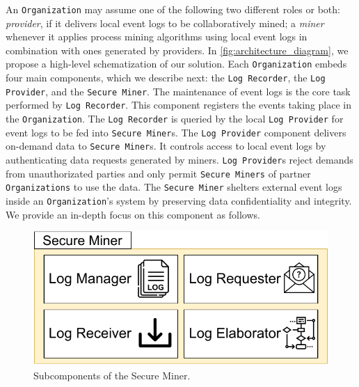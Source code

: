 An \texttt{Organization} may assume one of the following two different roles or both: \textit{provider}, if it delivers local event logs to be collaboratively mined; a \textit{miner} whenever it applies process mining algorithms using local event logs in combination with ones generated by providers. In \cref{fig:architecture_diagram}, we propose a high-level schematization of our solution. Each \texttt{Organization} embeds four main components, which we describe next: the \texttt{Log Recorder}, the \texttt{Log Provider}, and the \texttt{Secure Miner}. The maintenance of event logs is the core task performed by \texttt{Log Recorder}. This component registers the events taking place in the \texttt{Organization}. The \texttt{Log Recorder} is queried by the local \texttt{Log Provider} for event logs to be fed into \texttt{Secure Miner}s. The \texttt{Log Provider} component delivers on-demand data to \texttt{Secure Miner}s. It controls access to local event logs by authenticating data requests generated by miners. \texttt{Log Provider}s reject demands from unauthorizated parties and only permit \texttt{Secure Miners} of partner \texttt{Organizations} to use the data. The \texttt{Secure Miner} shelters external event logs inside an \texttt{Organization}'s system by preserving data confidentiality and integrity. We provide an in-depth focus on this component as follows.

\begin{figure}[t]
	\centering
	\includegraphics[width=0.6\linewidth]{content/figures/secure_miner.pdf}
	\caption{Subcomponents of the Secure Miner.}
	\label{fig:trusted_miner}
\end{figure}




